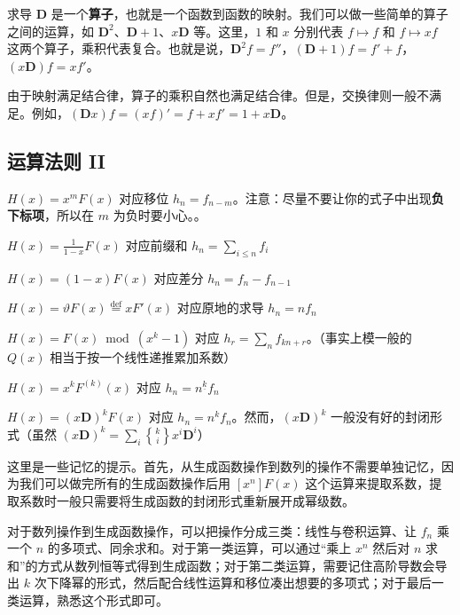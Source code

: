 \begin{remark}
    求导 $\mathbf D$ 是一个\textbf{算子}，也就是一个函数到函数的映射。我们可以做一些简单的算子之间的运算，如 $\mathbf D^2$、$\mathbf D+1$、$x\mathbf D$ 等。这里，$1$ 和 $x$ 分别代表 $f\mapsto f$ 和 $f\mapsto xf$ 这两个算子，乘积代表复合。也就是说，$\mathbf D^2 f=f''$，$(\mathbf D+1)f=f'+f$，$(x\mathbf D)f=xf'$。
    
    由于映射满足结合律，算子的乘积自然也满足结合律。但是，交换律则一般不满足。例如，$(\mathbf D x)f=(xf)'=f+xf'=1+x\mathbf D$。
\end{remark}


\subsection{运算法则 II}
    $H(x)=x^mF(x)$ 对应移位 $h_n=f_{n-m}$。注意：尽量不要让你的式子中出现\textbf{负下标项}，所以在 $m$ 为负时要小心。。

    $H(x)=\frac{1}{1-x}F(x)$ 对应前缀和 $h_n=\sum_{i\le n}f_i$

    $H(x)=(1-x)F(x)$ 对应差分 $h_n=f_n-f_{n-1}$

    $H(x)=\vartheta F(x)\overset{\mathrm{def}}{=}xF'(x)$ 对应原地的求导 $h_n=nf_n$

    $H(x)=F(x)\bmod (x^k-1)$ 对应 $h_r=\sum_n f_{kn+r}$。（事实上模一般的 $Q(x)$ 相当于按一个线性递推累加系数）

    $H(x)=x^kF^{(k)}(x)$ 对应 $h_n=n^{\underline{k}}f_n$

    $H(x)=(x\mathbf D)^kF(x)$ 对应 $h_n=n^k f_n$。然而，$(x\mathbf D)^k$ 一般没有好的封闭形式（虽然 $(x\mathbf D)^k=\sum_i {k\brace i}x^i\mathbf D^i$）
\begin{remark}
    这里是一些记忆的提示。首先，从生成函数操作到数列的操作不需要单独记忆，因为我们可以做完所有的生成函数操作后用 $[x^n]F(x)$ 这个运算来提取系数，提取系数时一般只需要将生成函数的封闭形式重新展开成幂级数。
    
    对于数列操作到生成函数操作，可以把操作分成三类：线性与卷积运算、让 $f_n$ 乘一个 $n$ 的多项式、同余求和。对于第一类运算，可以通过“乘上 $x^n$ 然后对 $n$ 求和”的方式从数列恒等式得到生成函数；对于第二类运算，需要记住高阶导数会导出 $k$ 次下降幂的形式，然后配合线性运算和移位凑出想要的多项式；对于最后一类运算，熟悉这个形式即可。 
\end{remark}
